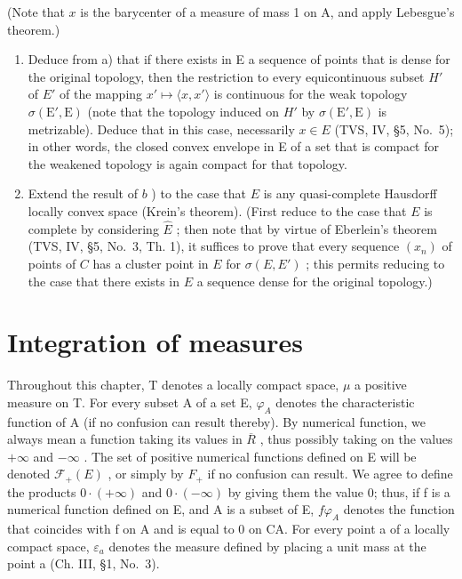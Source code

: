 (Note that \(x\) is the barycenter of a measure of mass 1 on A, and apply Lebesgue's theorem.)

\begin{enumerate}
\def\labelenumi{\alph{enumi})}
\setcounter{enumi}{1}
\item
  Deduce from a) that if there exists in E a sequence of points that is dense for the original topology, then the restriction to every equicontinuous subset \(H'\) of \(E'\) of the mapping \(x' \mapsto \langle x, x' \rangle\) is continuous for the weak topology \(\sigma(\mathrm{E}', \mathrm{E})\) (note that the topology induced on \(H'\) by \(\sigma(\mathrm{E}', \mathrm{E})\) is metrizable). Deduce that in this case, necessarily \(x \in E\) (TVS, IV, §5, No.~5); in other words, the closed convex envelope in E of a set that is compact for the weakened topology is again compact for that topology.
\item
  Extend the result of \(b\) ) to the case that \(E\) is any quasi-complete Hausdorff locally convex space (Krein's theorem). (First reduce to the case that \(E\) is complete by considering \(\widehat{E}\) ; then note that by virtue of Eberlein's theorem (TVS, IV, §5, No.~3, Th. 1), it suffices to prove that every sequence \((x_n)\) of points of \(C\) has a cluster point in \(E\) for \(\sigma(E, E')\) ; this permits reducing to the case that there exists in \(E\) a sequence dense for the original topology.)
\end{enumerate}

\chapter{Integration of measures}

Throughout this chapter, T denotes a locally compact space, \(\mu\) a positive measure on T. For every subset A of a set E, \(\varphi_{A}\) denotes the characteristic function of A (if no confusion can result thereby). By numerical function, we always mean a function taking its values in \(\overline{R}\) , thus possibly taking on the values \(+\infty\) and \(-\infty\) . The set of positive numerical functions defined on E will be denoted \(\mathcal{F}_{+}(E)\) , or simply by \(F_{+}\) if no confusion can result. We agree to define the products \(0 \cdot (+\infty)\) and \(0 \cdot (-\infty)\) by giving them the value 0; thus, if f is a numerical function defined on E, and A is a subset of E, \(f\varphi_{A}\) denotes the function that coincides with f on A and is equal to 0 on CA. For every point a of a locally compact space, \(\varepsilon_{a}\) denotes the measure defined by placing a unit mass at the point a (Ch. III, §1, No.~3).

